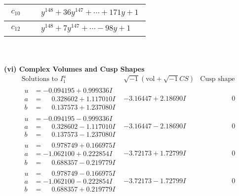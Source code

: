 \documentclass[1p]{elsarticle_modified}
\theoremstyle{definition}
\newcommand{\I}{\sqrt{-1}}
\begin{document}
\begin{tabular}{m{50pt}|m{274pt}}
\hline $$\begin{aligned}c_{10}\end{aligned}$$&$\begin{aligned}
&y^{148}+36 y^{147}+\cdots+171 y+1
\end{aligned}$\\
\hline $$\begin{aligned}c_{12}\end{aligned}$$&$\begin{aligned}
&y^{148}+7 y^{147}+\cdots-98 y+1
\end{aligned}$\\
\hline
\end{tabular}\\~\\
\newpage\flushleft \textbf{(vi) Complex Volumes and Cusp Shapes}
$$\begin{array}{c|c|c}  
\text{Solutions to }I^u_{1}& \I (\text{vol} + \sqrt{-1}CS) & \text{Cusp shape}\\
 \hline 
\begin{aligned}
u &= -0.094195 + 0.999336 I \\
a &= \phantom{-}0.328602 + 1.117010 I \\
b &= \phantom{-}0.137573 + 1.237080 I\end{aligned}
 & -3.16447 + 2.18690 I & \phantom{-0.000000 } 0 \\ \hline\begin{aligned}
u &= -0.094195 - 0.999336 I \\
a &= \phantom{-}0.328602 - 1.117010 I \\
b &= \phantom{-}0.137573 - 1.237080 I\end{aligned}
 & -3.16447 - 2.18690 I & \phantom{-0.000000 } 0 \\ \hline\begin{aligned}
u &= \phantom{-}0.978749 + 0.166975 I \\
a &= -1.062100 + 0.222854 I \\
b &= \phantom{-}0.688357 - 0.219779 I\end{aligned}
 & -3.72173 + 1.72799 I & \phantom{-0.000000 } 0 \\ \hline\begin{aligned}
u &= \phantom{-}0.978749 - 0.166975 I \\
a &= -1.062100 - 0.222854 I \\
b &= \phantom{-}0.688357 + 0.219779 I\end{aligned}
 & -3.72173 - 1.72799 I & \phantom{-0.000000 } 0 \\ \hline\begin{aligned}

\end{aligned}
\end{array}$$
\end{document}
